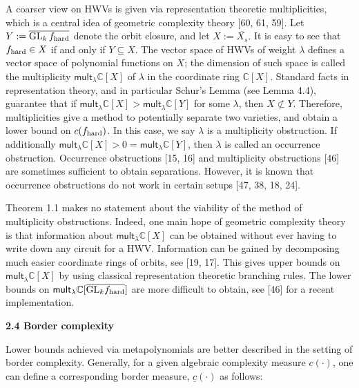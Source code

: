 A coarser view on HWVs is given via representation theoretic multiplicities, which is a central idea of geometric complexity theory [60, 61, 59].
Let $Y:=\overline{\textnormal{GL}_{k}\,f_{\textup{hard}}}$ denote the orbit closure, and let $X:=\overline{X_{s}}$.
It is easy to see that $f_{\textup{hard}}\in X$ if and only if $Y\subseteq X$.
The vector space of HWVs of weight $\lambda$ defines a vector space of polynomial functions on $X$; the dimension of such space is called
the multiplicity $\mathsf{mult}_{\lambda}\mathbb{C}[X]$ of $\lambda$ in the coordinate ring $\mathbb{C}[X]$. Standard facts in representation theory, and in particular Schur’s Lemma (see Lemma 4.4), guarantee that if $\mathsf{mult}_{\lambda}\mathbb{C}[X]>\mathsf{mult}_{\lambda}\mathbb{C}[Y]$ for some $\lambda$, then $X\not\subset Y$. Therefore, multiplicities give a method to potentially separate two varieties, and obtain a lower bound on $c(f_{\textup{hard}})$.
In this case, we say $\lambda$ is a multiplicity obstruction. If additionally
$\mathsf{mult}_{\lambda}\mathbb{C}[X]>0=\mathsf{mult}_{\lambda}\mathbb{C}[Y]$, then $\lambda$ is called an occurrence obstruction.
Occurrence obstructions [15, 16] and multiplicity obstructions [46] are sometimes sufficient to obtain separations. However, it is known that occurrence obstructions do not work in certain setups [47, 38, 18, 24].





Theorem 1.1 makes no statement about the viability of the method of multiplicity obstructions. Indeed, one main hope of geometric complexity theory is that information about $\mathsf{mult}_{\lambda}\mathbb{C}[X]$ can be obtained
without ever having to write down any circuit for a HWV.
Information can be gained
by decomposing much easier coordinate rings of orbits, see [19, 17]. This gives upper bounds on $\mathsf{mult}_{\lambda}\mathbb{C}[X]$ by using classical representation theoretic branching rules. The lower bounds on $\mathsf{mult}_{\lambda}\mathbb{C}[\overline{\textnormal{GL}_{k}f_{\textup{hard}}}]$ are more difficult to obtain, see [46] for a recent implementation.






\par\medskip\noindent\textbf{2.4 Border complexity}\par




Lower bounds achieved via metapolynomials are better described in the setting of border complexity. Generally, for a given algebraic complexity measure $c(\cdot)$, one can define a corresponding border measure, $\underline{c}(\cdot)$ as follows:



